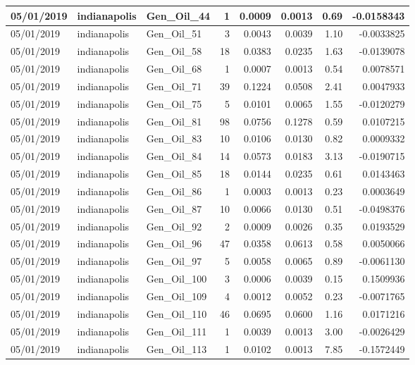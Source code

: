 \documentclass[
  letterpaper,
  DIV=11,
  numbers=noendperiod]{scrartcl}
\begin{document}
\begin{tabular}{l|l|l|r|r|r|r|r}
\hline
05/01/2019 & indianapolis & Gen\_Oil\_44 & 1 & 0.0009 & 0.0013 & 0.69 & -0.0158343\\
\hline
05/01/2019 & indianapolis & Gen\_Oil\_51 & 3 & 0.0043 & 0.0039 & 1.10 & -0.0033825\\
\hline
05/01/2019 & indianapolis & Gen\_Oil\_58 & 18 & 0.0383 & 0.0235 & 1.63 & -0.0139078\\
\hline
05/01/2019 & indianapolis & Gen\_Oil\_68 & 1 & 0.0007 & 0.0013 & 0.54 & 0.0078571\\
\hline
05/01/2019 & indianapolis & Gen\_Oil\_71 & 39 & 0.1224 & 0.0508 & 2.41 & 0.0047933\\
\hline
05/01/2019 & indianapolis & Gen\_Oil\_75 & 5 & 0.0101 & 0.0065 & 1.55 & -0.0120279\\
\hline
05/01/2019 & indianapolis & Gen\_Oil\_81 & 98 & 0.0756 & 0.1278 & 0.59 & 0.0107215\\
\hline
05/01/2019 & indianapolis & Gen\_Oil\_83 & 10 & 0.0106 & 0.0130 & 0.82 & 0.0009332\\
\hline
05/01/2019 & indianapolis & Gen\_Oil\_84 & 14 & 0.0573 & 0.0183 & 3.13 & -0.0190715\\
\hline
05/01/2019 & indianapolis & Gen\_Oil\_85 & 18 & 0.0144 & 0.0235 & 0.61 & 0.0143463\\
\hline
05/01/2019 & indianapolis & Gen\_Oil\_86 & 1 & 0.0003 & 0.0013 & 0.23 & 0.0003649\\
\hline
05/01/2019 & indianapolis & Gen\_Oil\_87 & 10 & 0.0066 & 0.0130 & 0.51 & -0.0498376\\
\hline
05/01/2019 & indianapolis & Gen\_Oil\_92 & 2 & 0.0009 & 0.0026 & 0.35 & 0.0193529\\
\hline
05/01/2019 & indianapolis & Gen\_Oil\_96 & 47 & 0.0358 & 0.0613 & 0.58 & 0.0050066\\
\hline
05/01/2019 & indianapolis & Gen\_Oil\_97 & 5 & 0.0058 & 0.0065 & 0.89 & -0.0061130\\
\hline
05/01/2019 & indianapolis & Gen\_Oil\_100 & 3 & 0.0006 & 0.0039 & 0.15 & 0.1509936\\
\hline
05/01/2019 & indianapolis & Gen\_Oil\_109 & 4 & 0.0012 & 0.0052 & 0.23 & -0.0071765\\
\hline
05/01/2019 & indianapolis & Gen\_Oil\_110 & 46 & 0.0695 & 0.0600 & 1.16 & 0.0171216\\
\hline
05/01/2019 & indianapolis & Gen\_Oil\_111 & 1 & 0.0039 & 0.0013 & 3.00 & -0.0026429\\
\hline
05/01/2019 & indianapolis & Gen\_Oil\_113 & 1 & 0.0102 & 0.0013 & 7.85 & -0.1572449\\

\end{tabular}
\end{document}
